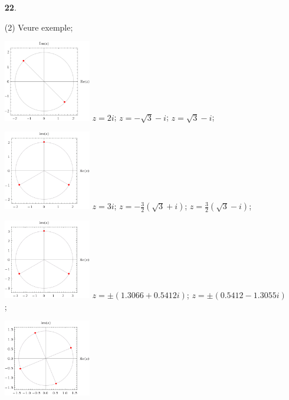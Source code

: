 \documentclass[a4paper, pdf, twoside]{book}
\begin{document}
\begin{multicols}{2}
\begin{enumerate}

 \item[\fontfamily{phv}\selectfont\color{blue}\textbf{22}. ] 
 \begin{tasks}[column-sep=1em, item-indent=1.3333em](2)
	 \task* Veure exemple;\par \includegraphics [width=0.3\textwidth ]{img-sol/t4-22a}
	 \task* $z=2i$; $z=-\sqrt {3}-i$; $z=\sqrt {3}-i$;\par \includegraphics [width=0.3\textwidth ]{img-sol/t4-22b}
	 \task* $z=3i$; $z=-\frac {3}{2}(\sqrt {3}+i)$; $z=\frac {3}{2}(\sqrt {3}-i)$;\par \includegraphics [width=0.3\textwidth ]{img-sol/t4-22c}
	 \task* $z=\pm (1.3066+0.5412 i)$; $z=\pm (0.5412-1.3055 i)$;\par \includegraphics [width=0.3\textwidth ]{img-sol/t4-22d} 
\end{tasks}
 \end{enumerate}
\vspace{0.3cm}


\end{multicols}
\end{document}
